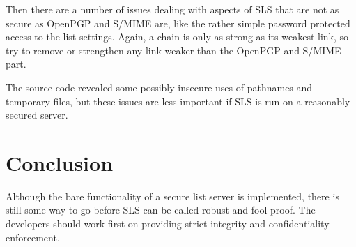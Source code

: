\documentclass[a4]{article}
\begin{document}
Then there are a number of issues dealing with aspects of SLS that are not as secure as OpenPGP and S/MIME are,
like the rather simple password protected access to the list settings.
Again, a chain is only as strong as its weakest link, so try to remove or strengthen any link weaker than the OpenPGP and S/MIME part.

The source code revealed some possibly insecure uses of pathnames and temporary files,
but these issues are less important if SLS is run on a reasonably secured server.

\section{Conclusion}

Although the bare functionality of a secure list server is implemented,
there is still some way to go before SLS can be called robust and fool-proof.
The developers should work first on providing strict integrity and confidentiality enforcement.
\end{document}
